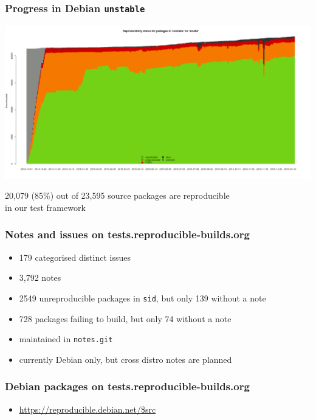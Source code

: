 \documentclass[14pt,aspectratio=169]{beamer}
\begin{document}
\begin{frame}
 \frametitle{Progress in Debian \texttt{unstable}}
 \begin{center}
  \includegraphics[height=0.65\paperheight]{images/stats_pkg_state.png}

  {\footnotesize{20,079 (85\%) out of 23,595 source packages are reproducible \\
    in our test framework}
  }
 \end{center}
\end{frame}

\begin{frame}
 \frametitle{Notes and issues on tests.reproducible-builds.org}

 \begin{itemize}
  \item { 179 categorised distinct issues }
  \item { 3,792 notes }
  \item<2-4> { 2549 unreproducible packages in \texttt{sid}, but only 139 without a 
  note }
  \item<2-4> { 728 packages failing to build, but only 74 without a note }
  \item<3-4> { maintained in \texttt{notes.git} }
  \item<4> { currently Debian only, but cross distro notes are planned}
 \end{itemize}
\end{frame}



\begin{frame}
 \frametitle{Debian packages on tests.reproducible-builds.org}
 \begin{itemize}
  \item \url {https://reproducible.debian.net/$src}
 \end{itemize}
\end{frame}
\end{document}
